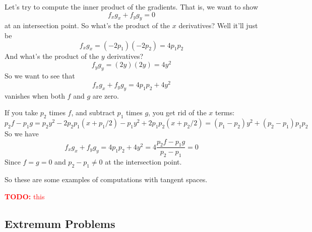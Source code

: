 \documentclass{article}
\newcommand{\TODO}[1]{\textcolor{red}{\textbf{TODO:} #1}}
\begin{document}
\begin{enumerate}
  Let's try to compute the inner product of the gradients. That is, we want to show
  \begin{equation}f_xg_x + f_yg_y = 0\end{equation}
  at an intersection point. So what's the product of the \(x\) derivatives? Well it'll just be
  \begin{equation}f_xg_x = (-2p_1)(-2p_2) = 4p_1p_2\end{equation}
  And what's the product of the \(y\) derivatives?
  \begin{equation}f_yg_y = (2y)(2y) = 4y^2\end{equation}
  So we want to see that
  \begin{equation}f_xg_x + f_yg_y = 4p_1p_2 + 4y^2\end{equation}
  vanishes when both \(f\) and \(g\) are zero.

  If you take \(p_2\) times \(f\), and subtract \(p_1\) times \(g\), you get rid of the \(x\) terms:
  \begin{equation}p_2f - p_1g = p_2y^2 - 2p_2p_1(x + p_1/2) - p_1y^2 + 2p_1p_2(x + p_2/2) = (p_1 - p_2)y^2 + (p_2 - p_1)p_1p_2\end{equation}
  So we have
  \begin{equation}f_xg_x + f_yg_y = 4p_1p_2 + 4y^2 = 4\frac{p_2f - p_1g}{p_2 - p_1} = 0\end{equation}
  Since \(f = g = 0\) and \(p_2 - p_1 \neq 0\) at the intersection point.

\end{enumerate}
So these are some examples of computations with tangent spaces.

\TODO{this}

\subsection{Extremum Problems}
\end{document}
